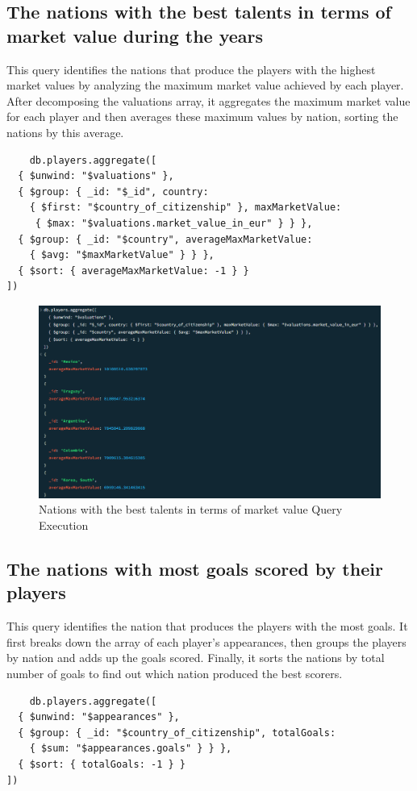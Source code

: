 \documentclass{Configuration_Files/PoliMi3i_thesis}
\begin{document}
\subsection{The nations with the best talents in terms of market value during the years}
This query identifies the nations that produce the players with the highest market values by analyzing the maximum market value achieved by each player. After decomposing the valuations array, it aggregates the maximum market value for each player and then averages these maximum values by nation, sorting the nations by this average.
\begin{verbatim}
    db.players.aggregate([
  { $unwind: "$valuations" },
  { $group: { _id: "$_id", country: 
    { $first: "$country_of_citizenship" }, maxMarketValue:
     { $max: "$valuations.market_value_in_eur" } } },
  { $group: { _id: "$country", averageMaxMarketValue: 
    { $avg: "$maxMarketValue" } } },
  { $sort: { averageMaxMarketValue: -1 } }
])
\end{verbatim}
\begin{figure}[htbp]
    \centering
    \includegraphics[scale=0.8]{Images/Queries/Nation_talents_market_value/ntmv.png}
    \caption{Nations with the best talents in terms of market value Query Execution}
\end{figure}

\subsection{The nations with most goals scored by their players}
This query identifies the nation that produces the players with the most goals. It first breaks down the array of each player's appearances, then groups the players by nation and adds up the goals scored. Finally, it sorts the nations by total number of goals to find out which nation produced the best scorers.
\begin{verbatim}
    db.players.aggregate([
  { $unwind: "$appearances" },
  { $group: { _id: "$country_of_citizenship", totalGoals: 
    { $sum: "$appearances.goals" } } },
  { $sort: { totalGoals: -1 } }
])
\end{verbatim}
\end{document}
